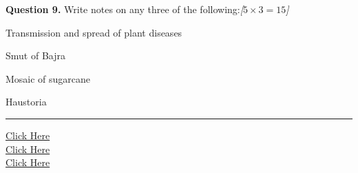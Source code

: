 \documentclass[11pt,a4paper]{article}
\newcommand{\pts}[1]{\hfill   \textit{[#1]}}
\begin{document}
\medskip


\noindent   \textbf{Question 9.} Write notes on any three of the following:\pts{$5  \times 3 = 15$}

\begin{parts}
  \item Transmission and spread of plant diseases
  \item Smut of Bajra
  \item Mosaic of sugarcane
  \item Haustoria
\end{parts}

\vfill
\rule{\linewidth}{0.4pt}

\begin{center}\small
\href{https://bhu-exam.vercel.app/}{Click Here}\\[4pt]\href{https://me-aryan.vercel.app/}{Click Here}\\[4pt]\href{https://quashan-me.vercel.app/}{Click Here}
\end{center}
\end{document}

